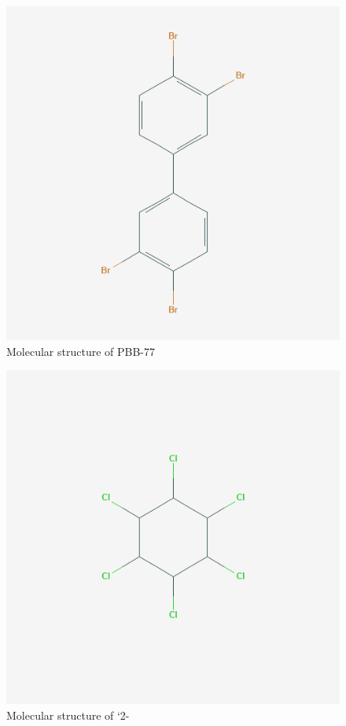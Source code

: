 \documentclass[a4paper, 12pt]{article}
\begin{document}
\begin{figure}[h!]
	\centering
	\includegraphics[width=1\textwidth]{pbb-77.png}
	\caption{Molecular structure of PBB-77}
	\label{fig-pbb}
\end{figure}

\begin{figure}[h!]
	\centering
	\includegraphics[width=1\textwidth]{lindane.png}
	\caption{Molecular structure of `2-}
	\label{fig-lindane}
\end{figure}
\end{document}
